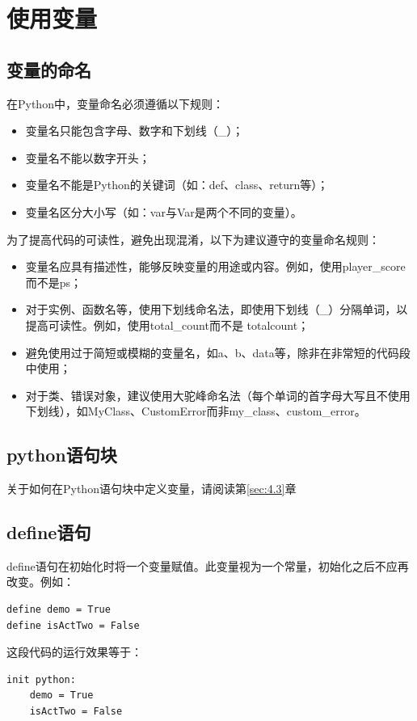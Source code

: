 \documentclass[../../Main.tex]{subfiles}
\begin{document}
\section{使用变量}
\subsection{变量的命名}
在Python中，变量命名必须遵循以下规则：
\begin{itemize}
    \item 变量名只能包含字母、数字和下划线（\_）；
    \item 变量名不能以数字开头；
    \item 变量名不能是Python的关键词（如：def、class、return等）；
    \item 变量名区分大小写（如：var与Var是两个不同的变量）。
\end{itemize}

为了提高代码的可读性，避免出现混淆，以下为建议遵守的变量命名规则：
\begin{itemize}
    \item 变量名应具有描述性，能够反映变量的用途或内容。例如，使用player\_score而不是ps；
    \item 对于实例、函数名等，使用下划线命名法，即使用下划线（\_）分隔单词，以提高可读性。例如，使用total\_count而不是 totalcount；
    \item 避免使用过于简短或模糊的变量名，如a、b、data等，除非在非常短的代码段中使用；
    \item 对于类、错误对象，建议使用大驼峰命名法（每个单词的首字母大写且不使用下划线），如MyClass、CustomError而非my\_class、custom\_error。
\end{itemize}

\subsection{python语句块}
关于如何在Python语句块中定义变量，请阅读第\ref{sec:4.3}章
\subsection{define语句}
define语句在初始化时将一个变量赋值。此变量视为一个常量，初始化之后不应再改变。例如：

\begin{lstlisting}
define demo = True
define isActTwo = False
\end{lstlisting}

这段代码的运行效果等于：
\begin{lstlisting}
init python:
    demo = True
    isActTwo = False
\end{lstlisting}
\end{document}

